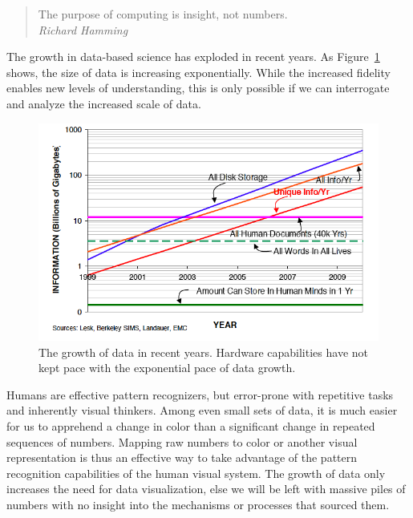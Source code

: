 \begin{quote}
	The purpose of computing is insight, not numbers.\\
	\indent \indent \textit{Richard Hamming}
\end{quote}

The growth in data-based science has exploded in recent years.  As
Figure~\ref{fig:growth} shows, the size of data is increasing
exponentially.  While the increased fidelity enables new levels of
understanding, this is only possible if we can interrogate and analyze
the increased scale of data.

\begin{figure}
	\includegraphics[width=\linewidth]{images/growth}

  \caption{The growth of data in recent years.  Hardware capabilities
  have not kept pace with the exponential pace of data growth.}

	\label{fig:growth}
\end{figure}

Humans are effective pattern recognizers, but error-prone with
repetitive tasks and inherently visual thinkers.  Among even small sets
of data, it is much easier for us to apprehend a change in color than
a significant change in repeated sequences of numbers.  Mapping raw
numbers to color or another visual representation is thus an effective
way to take advantage of the pattern recognition capabilities of the
human visual system.  The growth of data only increases the need for
data visualization, else we will be left with massive piles of numbers
with no insight into the mechanisms or processes that sourced them.

